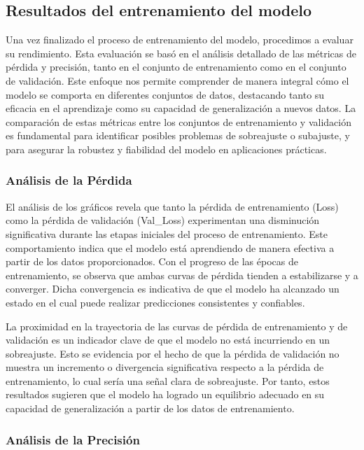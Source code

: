 \subsection{Resultados del entrenamiento del modelo}

Una vez finalizado el proceso de entrenamiento del modelo, procedimos a evaluar su rendimiento. Esta evaluación se basó en el análisis detallado de las métricas de pérdida y precisión, tanto en el conjunto de entrenamiento como en el conjunto de validación. Este enfoque nos permite comprender de manera integral cómo el modelo se comporta en diferentes conjuntos de datos, destacando tanto su eficacia en el aprendizaje como su capacidad de generalización a nuevos datos. La comparación de estas métricas entre los conjuntos de entrenamiento y validación es fundamental para identificar posibles problemas de sobreajuste o subajuste, y para asegurar la robustez y fiabilidad del modelo en aplicaciones prácticas.
\subsubsection{\textbf{Análisis de la Pérdida}} 
El análisis de los gráficos revela que tanto la pérdida de entrenamiento (Loss) como la pérdida de validación (Val\_Loss) experimentan una disminución significativa durante las etapas iniciales del proceso de entrenamiento. Este comportamiento indica que el modelo está aprendiendo de manera efectiva a partir de los datos proporcionados. Con el progreso de las épocas de entrenamiento, se observa que ambas curvas de pérdida tienden a estabilizarse y a converger. Dicha convergencia es indicativa de que el modelo ha alcanzado un estado en el cual puede realizar predicciones consistentes y confiables.

La proximidad en la trayectoria de las curvas de pérdida de entrenamiento y de validación es un indicador clave de que el modelo no está incurriendo en un sobreajuste. Esto se evidencia por el hecho de que la pérdida de validación no muestra un incremento o divergencia significativa respecto a la pérdida de entrenamiento, lo cual sería una señal clara de sobreajuste. Por tanto, estos resultados sugieren que el modelo ha logrado un equilibrio adecuado en su capacidad de generalización a partir de los datos de entrenamiento.

\subsubsection{\textbf{Análisis de la Precisión}} 

